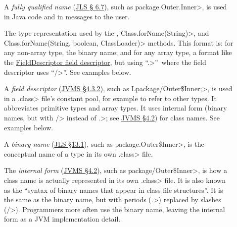 \begin{description}

\item[]
  A \emph{fully qualified name} (\href{https://docs.oracle.com/javase/specs/jls/se8/html/jls-6.html#jls-6.7}{JLS \S
    6.7}), such as
  \<package.Outer.Inner>, is used in Java code and in messages to
  the user.

\item[]
\begin{sloppypar}
  The type representation used by the
  , \<Class.forName(String)>,
  and \<Class.forName(String, boolean, ClassLoader)> methods.  This format
  is:  for any non-array type, the binary name; and for any array type, a
  format like the
  \href{https://docs.oracle.com/javase/specs/jvms/se8/html/jvms-4.html#jvms-4.3.2}{FieldDescriptor
    field descriptor}, but using
  ``\<.>''~where the field descriptor uses ``\</>''.  See examples below.
\end{sloppypar}

\item[]
  A \emph{field descriptor} (\href{https://docs.oracle.com/javase/specs/jvms/se8/html/jvms-4.html#jvms-4.3.2}{JVMS \S 4.3.2}), such as
  \<Lpackage/Outer\$Inner;>, is used in a \<.class> file's constant pool,
  for example to refer to other types.  It abbreviates primitive types and
  array types.  It uses internal form (binary names, but with \</> instead of
  \<.>; see
  \href{https://docs.oracle.com/javase/specs/jvms/se8/html/jvms-4.html#jvms-4.2.1}{JVMS
    \S 4.2}) for class names.  See examples below.

\item[]
  A \emph{binary name} (\href{https://docs.oracle.com/javase/specs/jls/se8/html/jls-13.html#jls-13.1}{JLS \S 13.1}), such as
  \<package.Outer\$Inner>, is
  the conceptual name of a type in its own \<.class> file.

\item[]
  The \emph{internal form}
  (\href{https://docs.oracle.com/javase/specs/jvms/se8/html/jvms-4.html#jvms-4.2}{JVMS
    \S 4.2}), such as \<package/Outer\$Inner>, is how a class name is
  actually represented in its own \<.class> file.  It is also known as the
  ``syntax of binary names that appear in class file structures''.  It is
  the same as the binary name, but with periods (\<.>) replaced by slashes
  (\</>).  Programmers more often use the binary name, leaving the internal
  form as a JVM implementation detail.


\end{description}
